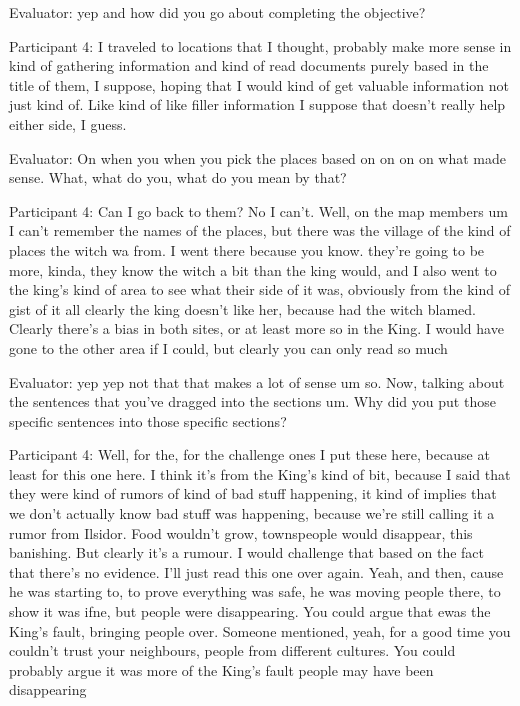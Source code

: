 \documentclass{l4proj}
\begin{document}
\begin{appendices}
Evaluator: yep and how did you go about completing the objective?

Participant 4: I traveled to locations that I thought, probably make more sense in kind of gathering information and kind of read documents purely based in the title of them, I suppose,  hoping that I would kind of get valuable information not just kind of. Like kind of like filler information I suppose that doesn't really help either side, I guess.

Evaluator: On when you when you pick the places based on on on on what made sense. What, what do you, what do you mean by that?

Participant 4: Can I go back to them? No I can’t. Well, on the map members um I can't remember the names of the places, but there was the village of the kind of places the witch wa from. I went there because you know. they're going to be more, kinda, they know the witch a bit than the king would, and I also went to the king’s kind of area to see what their side of it was, obviously from the kind of gist of it all clearly the king doesn’t like her, because had the witch blamed. Clearly there's a bias in both sites, or at least more so in the King. I would have gone to the other area if I could, but clearly you can only read so much

Evaluator: yep yep not that that makes a lot of sense um so. Now, talking about the sentences that you've dragged into the sections um. Why did you put those specific sentences into those specific sections?

 

Participant 4: Well, for the, for the challenge ones I put these here, because at least for this one here. I think it’s from the King’s kind of bit, because I said that they were kind of rumors of kind of bad stuff happening, it kind of implies that we don’t actually know bad stuff was happening, because we’re still calling it a rumor from Ilsidor. Food wouldn’t grow, townspeople would disappear, this banishing. But clearly it’s a rumour. I would challenge that based on the fact that there’s no evidence. I’ll just read this one over again. Yeah, and then, cause he was starting to, to prove everything was safe, he was moving people there, to show it was ifne, but people were disappearing. You could argue that ewas the King’s fault, bringing people over. Someone mentioned, yeah, for a good time you couldn’t trust your neighbours, people from different cultures. You could probably argue it was more of the King’s fault people may have been disappearing


\end{appendices}
\end{document}
